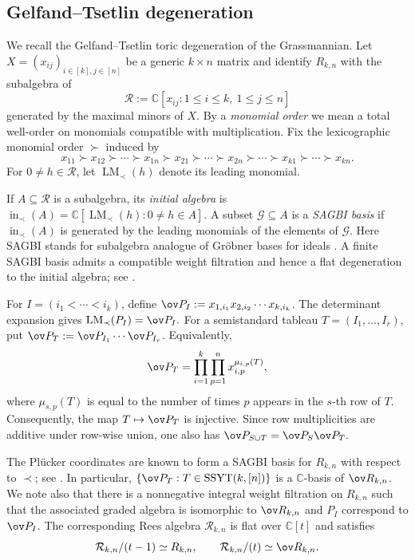 \documentclass[11pt]{amsart}
\numberwithin{equation}{section}
\newcommand{\bC}{{\mathbb C}}
\newcommand{\SSYT}{\mathrm{SSYT}}
\begin{document}
\subsection{Gelfand--Tsetlin degeneration}
\label{subsec:diagonal-sagbi-new}

We recall the Gelfand--Tsetlin toric degeneration of the Grassmannian.
Let $X=(x_{ij})_{i\in [k],j\in [n]}$ be a generic
$k\times n$ matrix and identify $R_{k,n}$ with the subalgebra of
$$\mathscr R:=\bC[x_{ij}:1\leq i\leq k,\ 1\leq j\leq n]$$ generated
by the maximal minors of $X$.  By a \emph{monomial order} we mean a
total well-order on monomials compatible with multiplication.  Fix the
lexicographic monomial order $\succ$ induced by
\[
x_{11}\succ x_{12}\succ\cdots\succ x_{1n}
\succ x_{21}\succ\cdots\succ x_{2n}
\succ\cdots\succ x_{k1}\succ\cdots\succ x_{kn}.
\]
For $0\neq h\in\mathscr R$, let
$\operatorname{LM}_{\prec}(h)$ denote its leading monomial.

If $A\subseteq\mathscr R$ is a subalgebra, its \emph{initial algebra}
is
$\operatorname{in}_{\prec}(A)
=\bC[\operatorname{LM}_{\prec}(h):0\neq h\in A]$.
A subset $\mathcal G\subseteq A$ is a \emph{SAGBI basis} if
$\operatorname{in}_{\prec}(A)$ is generated by the leading monomials
of the elements of $\mathcal G$.  Here SAGBI stands for
subalgebra analogue of Gr\"obner bases for ideals 
\cite{KaMa89,RS90}.  A finite SAGBI basis
admits a compatible weight filtration and hence a flat degeneration to
the initial algebra; see \cite[Chapter~11]{Stu96}.


For $I=(i_1<\cdots<i_k)$, define
$\ov P_I:=x_{1,i_1}x_{2,i_2}\cdots x_{k,i_k}$.  The determinant
expansion gives
$\mathrm{LM}_{\prec}(P_I)=\ov P_I.$
For a semistandard tableau $T=(I_1,\ldots,I_r)$, put
$\ov P_T:=\ov P_{I_1}\cdots\ov P_{I_r}$.  Equivalently,
\begin{equation}\label{eq:dT-row-multiplicities}
\ov P_T
=
\prod_{i=1}^k\prod_{p=1}^n
x_{i,p}^{\mu_{i,p}(T)},
\end{equation}
where $\mu_{s,p}(T)$ is equal to the number of times $p$ appears in the
$s$-th row of $T$.
Consequently, the map $T\mapsto\ov P_T$ is injective.  Since row
multiplicities are additive under row-wise union, one also has
$\ov P_{S\cup T}=\ov P_S\ov P_T.$


The Pl\"ucker coordinates are known to form a SAGBI basis for $R_{k,n}$ with
respect to $\prec$; see \cite{SZ93}.  In particular, 
$\{\ov P_T:T\in{\SSYT}(k,[n])\}$
is a $\bC$-basis of $\ov R_{k,n}$.
We note also that there is a nonnegative integral weight filtration
on $R_{k,n}$ such that the associated graded algebra is isomorphic to $\ov R_{k,n}$ and $P_I$ correspond to $\ov P_I$.
The corresponding Rees algebra $\mathcal R_{k,n}$ is flat over $\bC[t]$ and
satisfies
\[
\mathcal R_{k,n}/(t-1)\simeq R_{k,n},
\qquad
\mathcal R_{k,n}/(t)\simeq\ov R_{k,n}.
\] 
\end{document}

